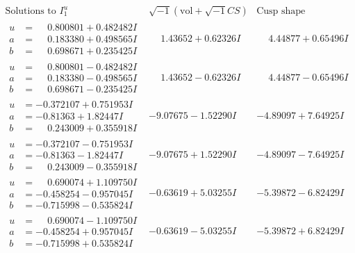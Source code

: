 \documentclass[1p]{elsarticle_modified}
\theoremstyle{definition}
\newcommand{\I}{\sqrt{-1}}
\begin{document}
$$\begin{array}{c|c|c}  
\text{Solutions to }I^u_{1}& \I (\text{vol} + \sqrt{-1}CS) & \text{Cusp shape}\\
 \hline 
\begin{aligned}
u &= \phantom{-}0.800801 + 0.482482 I \\
a &= \phantom{-}0.183380 + 0.498565 I \\
b &= \phantom{-}0.698671 + 0.235425 I\end{aligned}
 & \phantom{-}1.43652 + 0.62326 I & \phantom{-}4.44877 + 0.65496 I \\ \hline\begin{aligned}
u &= \phantom{-}0.800801 - 0.482482 I \\
a &= \phantom{-}0.183380 - 0.498565 I \\
b &= \phantom{-}0.698671 - 0.235425 I\end{aligned}
 & \phantom{-}1.43652 - 0.62326 I & \phantom{-}4.44877 - 0.65496 I \\ \hline\begin{aligned}
u &= -0.372107 + 0.751953 I \\
a &= -0.81363 + 1.82447 I \\
b &= \phantom{-}0.243009 + 0.355918 I\end{aligned}
 & -9.07675 - 1.52290 I & -4.89097 + 7.64925 I \\ \hline\begin{aligned}
u &= -0.372107 - 0.751953 I \\
a &= -0.81363 - 1.82447 I \\
b &= \phantom{-}0.243009 - 0.355918 I\end{aligned}
 & -9.07675 + 1.52290 I & -4.89097 - 7.64925 I \\ \hline\begin{aligned}
u &= \phantom{-}0.690074 + 1.109750 I \\
a &= -0.458254 - 0.957045 I \\
b &= -0.715998 - 0.535824 I\end{aligned}
 & -0.63619 + 5.03255 I & -5.39872 - 6.82429 I \\ \hline\begin{aligned}
u &= \phantom{-}0.690074 - 1.109750 I \\
a &= -0.458254 + 0.957045 I \\
b &= -0.715998 + 0.535824 I\end{aligned}
 & -0.63619 - 5.03255 I & -5.39872 + 6.82429 I \\ \hline\begin{aligned}

\end{aligned}
\end{array}$$
\end{document}
